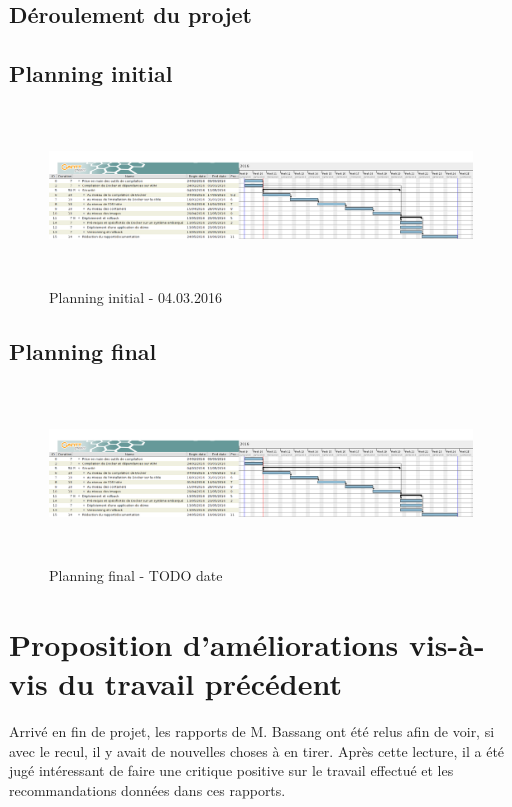 \documentclass[11pt,a4paper,oneside]{report}
\begin{document}
\begin{landscape}
\chapter{Déroulement du projet}


\section{Planning initial}
\begin{figure}[ht]
\centering
\includegraphics[height=4.7cm]{img/initial_planning.png}
\caption{Planning initial - 04.03.2016}
\end{figure}


\section{Planning final}
\begin{figure}[ht]
\centering
\includegraphics[draft,height=4.7cm]{img/initial_planning.png}
\caption{Planning final - TODO date}
\end{figure}

\end{landscape}


\chapter{Proposition d'améliorations vis-à-vis du travail précédent}
Arrivé en fin de projet, les rapports de M. Bassang ont été relus afin de voir, si avec le recul, il y avait de nouvelles choses à en tirer. Après cette lecture, il a été jugé intéressant de faire une critique positive sur le travail effectué et les recommandations données dans ces rapports.
\end{document}
